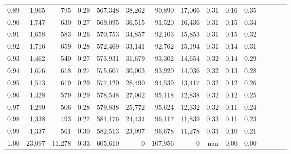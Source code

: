 \begin{tabular}{rrrcrrrrrrrrrrr}
0.89 &   1,965 &     795 &                                       0.29 &  567,348 &   38,262 &   90,890 &   17,066 &  0.31 &  0.16 &                         0.35 \\
0.90 &   1,747 &     630 &                                       0.27 &  569,095 &   36,515 &   91,520 &   16,436 &  0.31 &  0.15 &                         0.34 \\
0.91 &   1,658 &     583 &                                       0.26 &  570,753 &   34,857 &   92,103 &   15,853 &  0.31 &  0.15 &                         0.32 \\
0.92 &   1,716 &     659 &                                       0.28 &  572,469 &   33,141 &   92,762 &   15,194 &  0.31 &  0.14 &                         0.31 \\
0.93 &   1,462 &     540 &                                       0.27 &  573,931 &   31,679 &   93,302 &   14,654 &  0.32 &  0.14 &                         0.29 \\
0.94 &   1,676 &     618 &                                       0.27 &  575,607 &   30,003 &   93,920 &   14,036 &  0.32 &  0.13 &                         0.28 \\
0.95 &   1,513 &     619 &                                       0.29 &  577,120 &   28,490 &   94,539 &   13,417 &  0.32 &  0.12 &                         0.26 \\
0.96 &   1,428 &     579 &                                       0.29 &  578,548 &   27,062 &   95,118 &   12,838 &  0.32 &  0.12 &                         0.25 \\
0.97 &   1,290 &     506 &                                       0.28 &  579,838 &   25,772 &   95,624 &   12,332 &  0.32 &  0.11 &                         0.24 \\
0.98 &   1,338 &     493 &                                       0.27 &  581,176 &   24,434 &   96,117 &   11,839 &  0.33 &  0.11 &                         0.23 \\
0.99 &   1,337 &     561 &                                       0.30 &  582,513 &   23,097 &   96,678 &   11,278 &  0.33 &  0.10 &                         0.21 \\
1.00 &  23,097 &  11,278 &                                       0.33 &  605,610 &        0 &  107,956 &        0 &   nan &  0.00 &                         0.00 \\
\bottomrule
\end{tabular}
